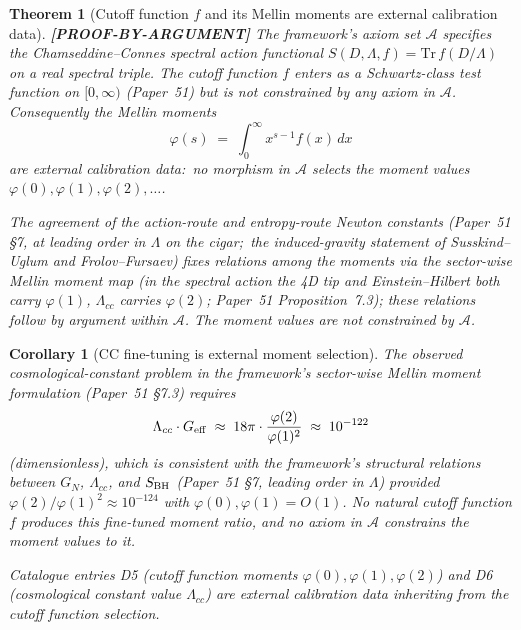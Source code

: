 \documentclass[11pt]{article}
\newtheorem{theorem}{Theorem}
\newtheorem{corollary}{Corollary}
\begin{document}
\begin{theorem}[Cutoff function $f$ and its Mellin moments are external calibration data]
\label{thm:cutoff_function_external}
\textbf{[PROOF-BY-ARGUMENT]}
The framework's axiom set $\mathcal{A}$ specifies the
Chamseddine--Connes spectral action functional $S(D, \Lambda, f) =
\mathrm{Tr}\, f(D/\Lambda)$ on a real spectral triple.  The cutoff
function $f$ enters as a Schwartz-class test function on $[0, \infty)$
(Paper~51) but is not constrained by any axiom in $\mathcal{A}$.
Consequently the Mellin moments
\[
  \varphi(s) \;=\; \int_0^\infty x^{s-1} f(x) \, dx
\]
are external calibration data:\ no morphism in $\mathcal{A}$ selects
the moment values $\varphi(0), \varphi(1), \varphi(2), \ldots$.

The agreement of the action-route and entropy-route Newton constants
(Paper~51 \S 7, at leading order in $\Lambda$ on the cigar;\ the
induced-gravity statement of Susskind--Uglum and Frolov--Fursaev)
fixes \emph{relations} among the moments via the sector-wise Mellin
moment map (in the spectral action the 4D tip and Einstein--Hilbert both
carry $\varphi(1)$, $\Lambda_{cc}$ carries $\varphi(2)$; Paper~51
Proposition~7.3);
these relations follow by argument within $\mathcal{A}$.  The moment
\emph{values} are not constrained by $\mathcal{A}$.
\end{theorem}

\begin{corollary}[CC fine-tuning is external moment selection]
\label{cor:cc_fine_tuning_external}
The observed cosmological-constant problem in the framework's
sector-wise Mellin moment formulation (Paper~51 \S 7.3) requires
\[
  \Lambda_{cc} \cdot G_{\rm eff} \;\approx\; 18\pi \cdot
  \frac{\varphi(2)}{\varphi(1)^2}
  \;\approx\; 10^{-122}
\]
(dimensionless), which is consistent with the framework's structural
relations between $G_N$, $\Lambda_{cc}$, and $S_{\rm BH}$
(Paper~51 \S 7, leading order in $\Lambda$) provided $\varphi(2)/\varphi(1)^2 \approx
10^{-124}$ with $\varphi(0), \varphi(1) = O(1)$.  No natural cutoff
function $f$ produces this fine-tuned moment ratio, and no axiom in
$\mathcal{A}$ constrains the moment values to it.

Catalogue entries D5 (cutoff function moments $\varphi(0), \varphi(1),
\varphi(2)$) and D6 (cosmological constant value $\Lambda_{cc}$) are
external calibration data inheriting from the cutoff function
selection.
\end{corollary}
\end{document}
